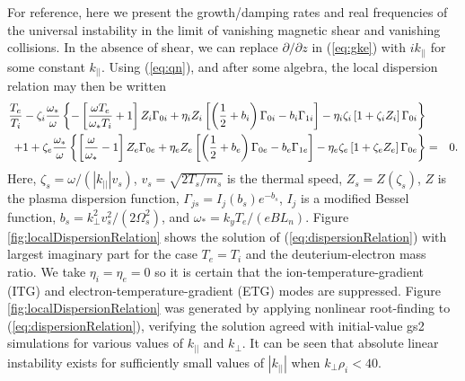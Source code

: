 \documentclass{jpp}
\begin{document}
For reference, here we present the growth/damping rates and real frequencies of the
universal instability in the limit of vanishing
magnetic shear and vanishing collisions.
In the absence of shear, we can replace $\partial/\partial z$ in (\ref{eq:gke})
with $i k_{||}$ for some constant $k_{||}$.
Using (\ref{eq:qn}), and after some algebra, the local dispersion relation may then be written
\begin{eqnarray}
\frac{T_e}{T_i}-\zeta_i\frac{\omega_{*}}{\omega}\left\{
-\left[\frac{\omega T_e}{\omega_{*} T_i}+1\right]Z_i \Gamma_{0i}
+\eta_i Z_i \left[ \left(\frac{1}{2}+b_i\right) \Gamma_{0i}-b_i \Gamma_{1i}\right]
-\eta_i \zeta_i \left[1+\zeta_i Z_i\right] \Gamma_{0i}\right\}
&&\label{eq:dispersionRelation} \\
+
1+\zeta_e\frac{\omega_{*}}{\omega}\left\{
\left[\frac{\omega}{\omega_{*}}-1\right]Z_e \Gamma_{0e}
+\eta_e Z_e \left[ \left(\frac{1}{2}+b_e\right) \Gamma_{0e}-b_e \Gamma_{1e}\right]
-\eta_e \zeta_e \left[1+\zeta_e Z_e\right] \Gamma_{0e}\right\}
&=&0.
\nonumber
\end{eqnarray}
Here, $\zeta_s = \omega/(\left| k_{||} \right| v_s)$, $v_s = \sqrt{2 T_s/m_s}$ is the thermal speed, $Z_s = Z(\zeta_s)$, $Z$ is the plasma dispersion function,
$\Gamma_{js} = I_j(b_s)e^{-b_s}$, $I_j$ is a modified Bessel function, $b_s = k_{\perp}^2 v_s^2/(2 \Omega_s^2)$,
and $\omega_* = k_y T_e/(e B L_n)$.
Figure \ref{fig:localDispersionRelation} shows the solution of (\ref{eq:dispersionRelation})
with largest imaginary part for the case $T_e = T_i$
and the deuterium-electron mass ratio.
We take $\eta_i = \eta_e = 0$
so it is certain that the ion-temperature-gradient (ITG) and electron-temperature-gradient (ETG)
modes are suppressed.
Figure \ref{fig:localDispersionRelation} was generated by applying nonlinear root-finding to (\ref{eq:dispersionRelation}),
verifying the solution agreed with initial-value gs2 simulations for various values of $k_{||}$ and $k_{\perp}$.
It can be seen that absolute linear instability exists for sufficiently small values of $\left|k_{||}\right|$
when $k_{\perp} \rho_i < 40$.
\end{document}
